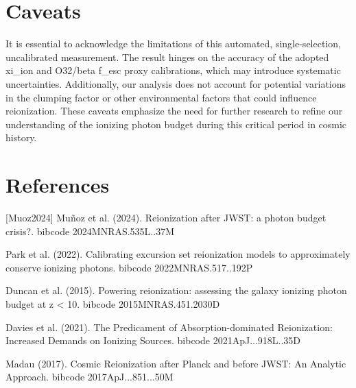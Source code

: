 \documentclass[twocolumn]{aastex631}
\begin{document}
\section{Caveats}
It is essential to acknowledge the limitations of this automated, single-selection, uncalibrated measurement. The result hinges on the accuracy of the adopted xi\_ion and O32/beta f\_esc proxy calibrations, which may introduce systematic uncertainties. Additionally, our analysis does not account for potential variations in the clumping factor or other environmental factors that could influence reionization. These caveats emphasize the need for further research to refine our understanding of the ionizing photon budget during this critical period in cosmic history.
\section*{References}
\footnotesize
[Muoz2024] Muñoz et al. (2024). Reionization after JWST: a photon budget crisis?. bibcode 2024MNRAS.535L..37M \par [Park2022] Park et al. (2022). Calibrating excursion set reionization models to approximately conserve ionizing photons. bibcode 2022MNRAS.517..192P \par [Duncan2015] Duncan et al. (2015). Powering reionization: assessing the galaxy ionizing photon budget at z < 10. bibcode 2015MNRAS.451.2030D \par [Davies2021] Davies et al. (2021). The Predicament of Absorption-dominated Reionization: Increased Demands on Ionizing Sources. bibcode 2021ApJ...918L..35D \par [Madau2017] Madau (2017). Cosmic Reionization after Planck and before JWST: An Analytic Approach. bibcode 2017ApJ...851...50M
\end{document}
